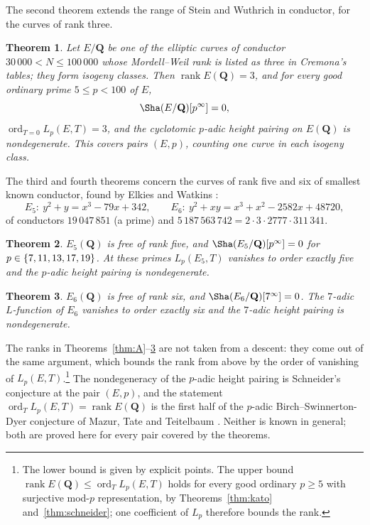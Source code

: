 \documentclass[11pt]{amsart}
\newtheorem{mainthm}{Theorem}
\theoremstyle{definition}
\newcommand{\Q}{\mathbf{Q}}
\newcommand{\rk}{\operatorname{rank}}
\newcommand{\ord}{\operatorname{ord}}
\begin{document}
The second theorem extends the range of Stein and Wuthrich in conductor, for the curves of rank three.

\begin{mainthm}\label{thm:B}
Let $E/\Q$ be one of the \NBcurves{} elliptic curves of conductor $30\,000<N\le100\,000$ whose Mordell--Weil rank is listed as three in Cremona's tables; they form \NBclasses{} isogeny classes. Then $\rk E(\Q)=3$, and for every good ordinary prime $5\le p<100$ of $E$,
\[
\Sha(E/\Q)[p^\infty]=0,
\]
$\ord_{T=0}L_p(E,T)=3$, and the cyclotomic $p$-adic height pairing on $E(\Q)$ is nondegenerate. This covers \NBtotal{} pairs $(E,p)$, counting one curve in each isogeny class.
\end{mainthm}

The third and fourth theorems concern the curves of rank five and six of smallest known conductor, found by Elkies and Watkins \cite{EW04}:
\[
E_5\colon\ y^2+y=x^3-79x+342,\qquad
E_6\colon\ y^2+xy=x^3+x^2-2582x+48720,
\]
of conductors $19\,047\,851$ (a prime) and $5\,187\,563\,742=2\cdot3\cdot2777\cdot311\,341$.

\begin{mainthm}\label{thm:C}
$E_5(\Q)$ is free of rank five, and $\Sha(E_5/\Q)[p^\infty]=0$ for $p\in\{7,11,13,17,19\}$. At these primes $L_p(E_5,T)$ vanishes to order exactly five and the $p$-adic height pairing is nondegenerate.
\end{mainthm}

\begin{mainthm}\label{thm:D}
$E_6(\Q)$ is free of rank six, and $\Sha(E_6/\Q)[7^\infty]=0$. The $7$-adic $L$-function of $E_6$ vanishes to order exactly six and the $7$-adic height pairing is nondegenerate.
\end{mainthm}

The ranks in Theorems~\ref{thm:A}--\ref{thm:D} are not taken from a descent: they come out of the same argument, which bounds the rank from above by the order of vanishing of $L_p(E,T)$.\footnote{The lower bound is given by explicit points. The upper bound $\rk E(\Q)\le\ord_TL_p(E,T)$ holds for every good ordinary $p\ge5$ with surjective mod-$p$ representation, by Theorems~\ref{thm:kato} and~\ref{thm:schneider}; one coefficient of $L_p$ therefore bounds the rank.} The nondegeneracy of the $p$-adic height pairing is Schneider's conjecture \cite{Sch82} at the pair $(E,p)$, and the statement $\ord_TL_p(E,T)=\rk E(\Q)$ is the first half of the $p$-adic Birch--Swinnerton-Dyer conjecture of Mazur, Tate and Teitelbaum \cite{MTT86}. Neither is known in general; both are proved here for every pair covered by the theorems.
\end{document}
